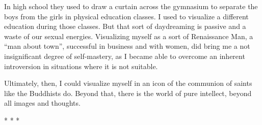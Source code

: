 In high school they used to draw a curtain across the gymnasium to separate the boys from the girls in physical education classes. I used to visualize a different education during those classes. But that sort of daydreaming is passive and a waste of our sexual energies. Visualizing myself as a sort of Renaissance Man, a ``man about town'', successful in business and with women, did bring me a not insignificant degree of self-mastery, as I became able to overcome an inherent introversion in situations where it is not suitable.

Ultimately, then, I could visualize myself in an icon of the communion of saints like the Buddhists do. Beyond that, there is the world of pure intellect, beyond all images and thoughts.



\begin{center}* * *\end{center}

